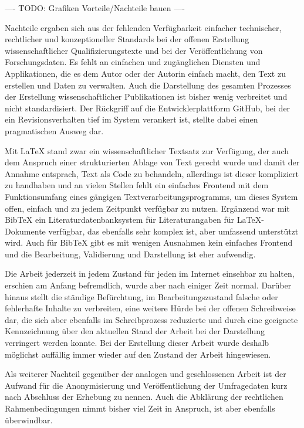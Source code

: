 ---- TODO: Grafiken Vorteile/Nachteile bauen ----

Nachteile ergaben sich aus der fehlenden Verfügbarkeit einfacher technischer, rechtlicher und konzeptioneller Standards bei der offenen Erstellung wissenschaftlicher Qualifizierungstexte und bei der Veröffentlichung von Forschungsdaten. Es fehlt an einfachen und zugänglichen Diensten und Applikationen, die es dem Autor oder der Autorin einfach macht, den Text zu erstellen und Daten zu verwalten. Auch die Darstellung des gesamten Prozesses der Erstellung wissenschaftlicher Publikationen ist bisher wenig verbreitet und nicht standardisiert. Der Rückgriff auf die Entwicklerplattform GitHub, bei der ein Revisionsverhalten tief im System verankert ist, stellte dabei einen pragmatischen Ausweg dar.

Mit LaTeX stand zwar ein wissenschaftlicher Textsatz zur Verfügung, der auch dem Anspruch einer strukturierten Ablage von Text gerecht wurde und damit der Annahme entsprach, Text als Code zu behandeln, allerdings ist dieser kompliziert zu handhaben und an vielen Stellen fehlt ein einfaches Frontend mit dem Funktionsumfang eines gängigen Textverarbeitungsprogramms, um dieses System offen, einfach und zu jedem Zeitpunkt verfügbar zu nutzen. Ergänzend war mit BibTeX ein Literaturdatenbanksystem für Literaturangaben für LaTeX-Dokumente verfügbar, das ebenfalls sehr komplex ist, aber umfassend unterstützt wird. Auch für BibTeX gibt es mit wenigen Ausnahmen kein einfaches Frontend und die Bearbeitung, Validierung und Darstellung ist eher aufwendig.

Die Arbeit jederzeit in jedem Zustand für jeden im Internet einsehbar zu halten, erschien am Anfang befremdlich, wurde aber nach einiger Zeit normal. Darüber hinaus stellt die ständige Befürchtung, im Bearbeitungszustand falsche oder fehlerhafte Inhalte zu verbreiten, eine weitere Hürde bei der offenen Schreibweise dar, die sich aber ebenfalls im Schreibprozess reduzierte und durch eine geeignete Kennzeichnung über den aktuellen Stand der Arbeit bei der Darstellung verringert werden konnte. Bei der Erstellung dieser Arbeit wurde deshalb möglichst auffällig immer wieder auf den Zustand der Arbeit hingewiesen.

Als weiterer Nachteil gegenüber der analogen und geschlossenen Arbeit ist der Aufwand für die Anonymisierung und Veröffentlichung der Umfragedaten kurz nach Abschluss der Erhebung zu nennen. Auch die Abklärung der rechtlichen Rahmenbedingungen nimmt bisher viel Zeit in Anspruch, ist aber ebenfalls überwindbar.

